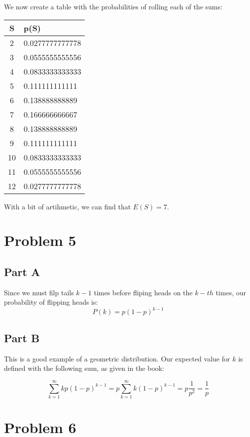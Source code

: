 \documentclass[12pt]{article}
\begin{document}
We now create a table with the probabilities of rolling each of the sums:

\begin{tabular}{|c | l|}

\hline
S & p(S) \\
\hline
2 & 0.0277777777778 \\
\hline
3 & 0.0555555555556 \\
\hline
4 & 0.0833333333333 \\
\hline
5 & 0.111111111111 \\
\hline
6 & 0.138888888889 \\
\hline
7 & 0.166666666667 \\
\hline
8 & 0.138888888889 \\
\hline
9 & 0.111111111111 \\
\hline
10 & 0.0833333333333 \\
\hline
11 & 0.0555555555556 \\
\hline
12 & 0.0277777777778 \\
\hline
\end{tabular}

With a bit of artihmetic, we can find that $E(S) = 7$.



\section*{Problem 5}

\subsection*{Part A}
Since we must filp tails $k-1$ times before fliping heads on the $k-th$ times, our probability of flipping heads is:
\[
P(k) = p(1-p)^{k-1}
\]

\subsection*{Part B}
This is a good example of a geometric distribution. Our expected value for $k$ is defined with the following sum, as given in the book:

\[
\sum_{k=1}^{\infty} kp(1-p)^{k-1} = p \sum_{k=1}^{\infty} k(1-p)^{k-1} = p \frac{1}{p^2} = \frac{1}{p}
\]




\section*{Problem 6}
\end{document}
